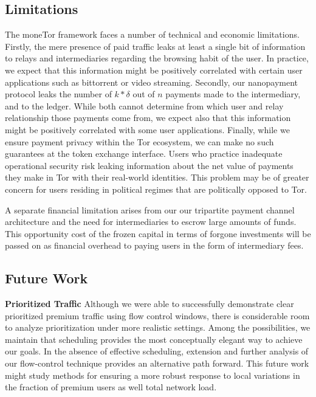 \subsection{Limitations}
\label{subsec:limitations}

The moneTor framework faces a number of technical and economic
limitations. Firstly, the mere presence of paid traffic leaks at least a single
bit of information to relays and intermediaries regarding the browsing habit of
the user. In practice, we expect that this information might be positively
correlated with certain user applications such as bittorrent or video
streaming. Secondly, our nanopayment protocol leaks the number of $k*\delta$ out of $n$ payments made to the intermediary, and to the ledger. While both cannot determine from which user and relay relationship those payments come from, we expect also that this information might be positively correlated with some user applications.
Finally, while we ensure payment privacy within the Tor ecosystem,
we can make no such guarantees at the token exchange interface. Users who
practice inadequate operational security risk leaking information about the net
value of payments they make in Tor with their real-world identities. This
problem may be of greater concern for users residing in political regimes that
are politically opposed to Tor.

A separate financial limitation arises from our our tripartite payment channel
architecture and the need for intermediaries to escrow large amounts of
funds. This opportunity cost of the frozen capital in terms of forgone
investments will be passed on as financial overhead to paying users in the form
of intermediary fees.

\subsection{Future Work}
\label{subsec:future_work}

\textbf{Prioritized Traffic} Although we were able to successfully demonstrate
clear prioritized premium traffic using flow control windows, there is
considerable room to analyze prioritization under more realistic settings. Among
the possibilities, we maintain that scheduling provides the most conceptually
elegant way to achieve our goals. In the absence of effective scheduling,
extension and further analysis of our flow-control technique provides an
alternative path forward. This future work might study methods for ensuring a
more robust response to local variations in the fraction of premium users as
well total network load.

